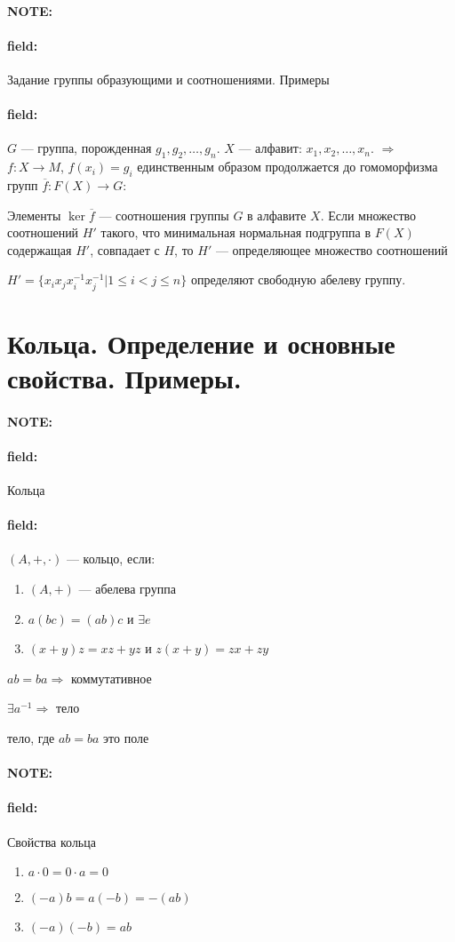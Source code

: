 \documentclass[12pt]{article}
\newenvironment{note}{\paragraph{NOTE:}}{}
\newenvironment{field}{\paragraph{field:}}{}
\begin{document}
\begin{note}
  \begin{field}
    Задание группы образующими и соотношениями. Примеры
  \end{field}
  \begin{field}
    $G$ --- группа, порожденная $g_{1}, g_{2}, \ldots, g_{n}$.
    $X$ --- алфавит: $x_{1}, x_{2}, \ldots, x_{n}$.
    $\Rightarrow$
    $f : X \rightarrow M$, $f(x_{i}) = g_{i}$
    единственным образом продолжается до гомоморфизма групп
    $\overline{f}: F(X) \rightarrow G$:

    Элементы $\ker \overline{f}$ --- соотношения группы $G$ в алфавите $X$. Если множество соотношений $H'$ такого, что минимальная нормальная подгруппа в $F(X)$ содержащая $H'$, совпадает с $H$, то $H'$ --- определяющее множество соотношений

    $H' = \{x_{i}x_{j}x_{i}^{-1}x_{j}^{-1} | 1 \leq i < j \leq n\}$
    определяют свободную абелеву группу.
  \end{field}
\end{note}

\section{Кольца. Определение и основные свойства. Примеры.}

\begin{note}
  \begin{field}
    Кольца
  \end{field}
  \begin{field}
    $(A, +, \cdot)$ --- кольцо, если:
    \begin{enumerate}
      \item
      $(A, +)$ --- абелева группа
      \item
      $a(bc) = (ab)c$ и $\exists e$
      \item
      $(x + y)z = xz + yz$ и $z(x + y) = zx + zy$
    \end{enumerate}

    $ab = ba \Rightarrow$ коммутативное

    $\exists a^{-1} \Rightarrow$ тело

    тело, где $ab = ba$ это поле
  \end{field}
\end{note}

\begin{note}
  \begin{field}
    Свойства кольца
  \end{field}
  \begin{enumerate}
    \item
    $a \cdot 0 = 0 \cdot a = 0$
    \item
    $(-a)b = a(-b) = -(ab)$
    \item
    $(-a)(-b) = ab$
  \end{enumerate}
\end{note}
\end{document}
